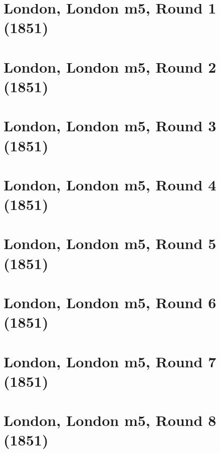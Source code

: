 \documentclass[11pt]{article}
\newcommand*\cleartoleftpage{%
   \clearpage
   \ifodd\value{page}\hbox{}\newpage\fi
}
\begin{document}
\cleartoleftpage

\section{London, London m5, Round 1 (1851)}


\cleartoleftpage

\section{London, London m5, Round 2 (1851)}


\cleartoleftpage

\section{London, London m5, Round 3 (1851)}


\cleartoleftpage

\section{London, London m5, Round 4 (1851)}


\cleartoleftpage

\section{London, London m5, Round 5 (1851)}


\cleartoleftpage

\section{London, London m5, Round 6 (1851)}


\cleartoleftpage

\section{London, London m5, Round 7 (1851)}


\cleartoleftpage

\section{London, London m5, Round 8 (1851)}

\end{document}
